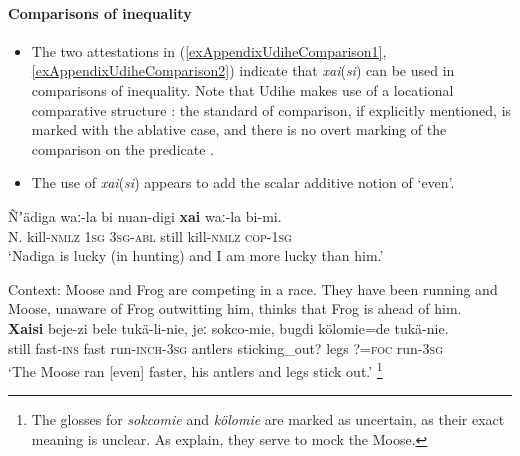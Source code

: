 \paragraph{Comparisons of inequality}\label{appendixUdiheComparisons}
\begin{itemize}
	\item The two attestations in (\ref{exAppendixUdiheComparison1}, \ref{exAppendixUdiheComparison2}) indicate that \mbox{\textit{xai}(\textit{si})} can be used in comparisons of inequality. Note that Udihe makes use of a locational comparative structure \parencite{Stassen2013}: the standard of comparison, if explicitly mentioned, is marked with the ablative case, and there is no overt marking of the comparison on the predicate \parencite[398–399]{NikolaevaTolskaya2001}.
	\item The use of \mbox{\textit{xai}(\textit{si})} appears to add the scalar additive notion of \lq even\rq{}.
\end{itemize}
\begin{exe}
	\ex\label{exAppendixUdiheComparison1}
	\gll Ñʼädiga waː-la bi nuan-digi \textbf{xai} waː-la bi-mi.\\
	N. kill-\textsc{nmlz} 1\textsc{sg} 3\textsc{sg}-\textsc{abl} still kill-\textsc{nmlz} \textsc{cop}-1\textsc{sg}\\
	\glt \lq Nadiga is lucky (in hunting) and I am more lucky than him.\rq{ }\parencite[440]{NikolaevaTolskaya2001}

	\ex\label{exAppendixUdiheComparison2}
	Context: Moose and Frog are competing in a race. They have been running and Moose, unaware of Frog outwitting him, thinks that Frog is ahead of him.\\
	\gll \textbf{Xaisi} beje-zi bele tukä-li-nie, jeː sokco-mie, bugdi kölomie=de tukä-nie.\\
	still fast-\textsc{ins} fast run-\textsc{inch}-3\textsc{sg} antlers sticking\_out? legs ?=\textsc{foc} run-3\textsc{sg}\\
	\glt \lq The Moose ran [even] faster, his antlers and legs stick out.\rq{ }\parencite[The moose and the frog]{NikolaevaEtAl2019}\footnote{The glosses for \textit{sokcomie} and \textit{kölomie} are marked as uncertain, as their exact meaning is unclear. As \textcite{NikolaevaEtAl2019} explain, they serve to mock the Moose.}
\end{exe} 

